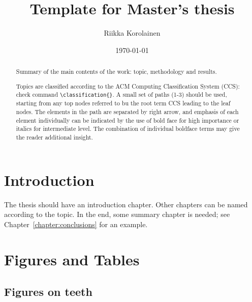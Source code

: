 \documentclass[english,twoside,openright]{HYgraduMLDS}
\title{Template for Master's thesis}
\author{Riikka Korolainen}
\date{\today}
\begin{document}
\maketitle


\begin{abstract}
Summary of the main contents of the work: topic, methodology and results.

Topics are classified according to the ACM Computing Classification System
(CCS): check command \verb+\classification{}+. A small set of paths (1-3) should be used, starting from any top nodes
referred to bu the root term CCS leading to the leaf nodes. The elements
in the path are separated by right arrow, and emphasis of each element individually can be indicated
by the use of bold face for high importance or italics for intermediate
level. The combination of individual boldface terms may give the reader
additional insight. 
\end{abstract}

\mytableofcontents

\mynomenclature

\chapter{Introduction}

The thesis should have an introduction chapter. Other chapters can be named according to the topic. In the end, some summary chapter is needed; see Chapter~\ref{chapter:conclusions} for an example.

\chapter{Figures and Tables}

\section{Figures on teeth}
\end{document}

